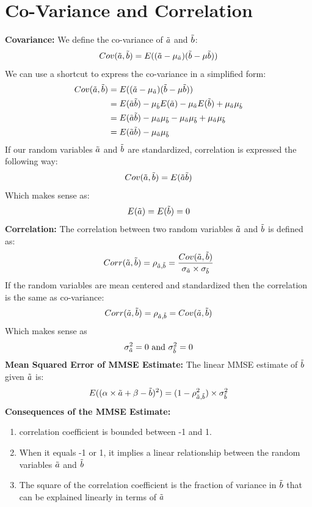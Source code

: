 \documentclass[12pt,twoside]{article}
\newcommand{\rnd}{\Tilde}
\newcommand{\ra}{\rnd{ a}  }
\newcommand{\rb}{\rnd{ b}  }
\begin{document}
\section*{Co-Variance and Correlation}
\textbf{Covariance:}
We define the co-variance of $\ra$ and $\rb$:
$$
Cov(\ra , \rb) = E((\ra-\mu_{\ra})(\rb - \mu{\rb}))
$$
We can use a shortcut to express the co-variance in a simplified form:
\begin{equation}
    \begin{split}
       Cov(\ra , \rb) &= E((\ra-\mu_{\ra})(\rb - \mu{\rb})) \\
       &= E(\ra \rb) - \mu_{\rb}E(\ra) - \mu_{\ra}E(\rb) +\mu_{\ra}\mu_{\rb}\\
       &= E(\ra \rb) - \mu_{\ra}\mu_{\rb} - \mu_{\ra}\mu_{\rb} +\mu_{\ra}\mu_{\rb}\\
       &= E(\ra \rb) - \mu_{\ra}\mu_{\rb} 
    \end{split}
\end{equation}
If our random variables $\ra$ and $\rb$ are standardized, correlation is expressed the following way:
$$
Cov(\ra , \rb) =  E(\ra \rb)
$$   
Which makes sense as: $$E(\ra) = E(\rb) = 0$$
\textbf{Correlation:}
The correlation between two random variables $\ra$ and $\rb$ is defined as:
$$
    Corr(\ra,\rb) = \rho_{\ra,\rb} = \frac{Cov(\ra,\rb)}{\sigma_{\ra} \times \sigma_{\rb}}
$$
If the random variables are mean centered and standardized then the correlation is the same as co-variance:
$$
Corr(\ra,\rb) = \rho_{\ra,\rb} = Cov(\ra,\rb)
$$
Which makes sense as $$\sigma_{\ra}^2=0 \text{ and } \sigma_{\rb}^2=0$$
\textbf{Mean Squared Error of MMSE Estimate:}
The linear MMSE estimate of $\rb$ given $\ra$ is:
$$
    E((\alpha \times \ra + \beta -\rb)^2) = (1-\rho_{\ra,\rb}^2) \times \sigma_{\rb}^2
$$
\textbf{Consequences of the MMSE Estimate:}
\begin{enumerate}
    \item correlation coefficient is bounded between -1 and 1.
    \item When it equals -1 or 1, it implies a linear relationship between the random variables $\ra$ and $\rb$
    \item The square of the correlation coefficient is the fraction of variance in $\rb$ that can be explained linearly in terms of $\ra$
\end{enumerate}
\end{document}
